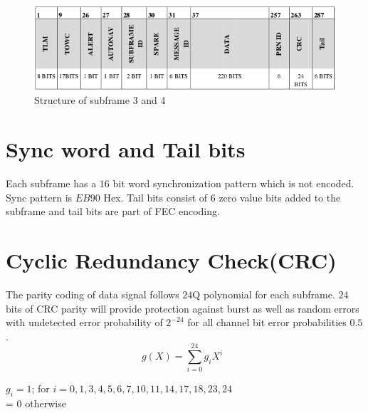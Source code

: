 \begin{figure}[ht]
\centering
\includegraphics[width=0.8\columnwidth]{figs/3_4.png}
\centering
\captionsetup{justification=centering}
\caption{Structure of subframe 3 and 4}
\label{fig:frame_3_4}
\end{figure}

\section{Sync word and Tail bits}
Each subframe has a $16$ bit word synchronization pattern which is not encoded. Sync pattern is $EB90$ Hex. Tail bits consist of $6$ zero value bits added to the subframe and tail bits are part of FEC encoding. 

\section{Cyclic Redundancy Check(CRC)}
The parity coding of data signal follows $24$Q polynomial for each subframe. $24$ bits of CRC parity will provide protection against burst as well as random errors with undetected error probability of $2^{-24}$ for all channel bit error probabilities $0.5$.
\begin{equation}
    g(X) = \sum_{i = 0}^{24}g_{i}X^i\;\; 
\end{equation}

    $g_{i}=1$; for $i = 0,1,3,4,5,6,7,10,11,14,17,18,23,24$ \\
          = 0 otherwise

\let\cleardoublepage\clearpage
